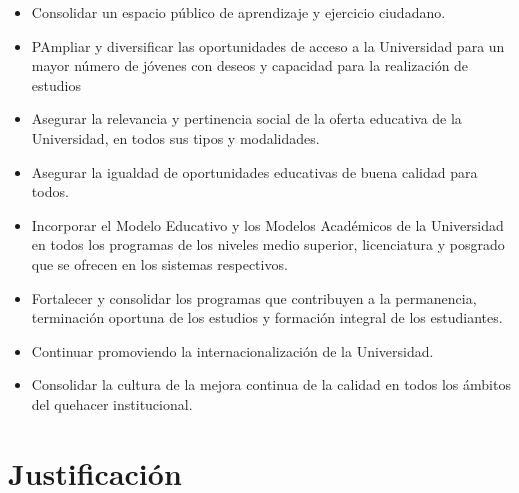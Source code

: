 \documentclass{article}
\begin{document}
\begin{itemize}
\item{Consolidar un espacio p\'{u}blico de aprendizaje y ejercicio
    ciudadano.}
\item{PAmpliar y diversificar las oportunidades de acceso a la
    Universidad para un mayor n\'{u}mero de j\'{o}venes con deseos y capacidad
    para la realizaci\'{o}n de estudios}
\item{Asegurar la relevancia y pertinencia social de la oferta
    educativa de la Universidad, en todos sus tipos y
    modalidades.}
\item{Asegurar la igualdad de oportunidades educativas de buena
    calidad para todos.}
\item{Incorporar el Modelo Educativo y los Modelos Acad\'{e}micos de la
    Universidad en todos los programas de los niveles medio superior,
    licenciatura y posgrado que se ofrecen en los sistemas respectivos.}
    \item{Fortalecer y consolidar los programas que contribuyen a la
    permanencia, terminaci\'{o}n oportuna de los estudios y formaci\'{o}n
    integral de los estudiantes.}
\item{Continuar promoviendo la internacionalizaci\'{o}n de la Universidad.}
\item{Consolidar la cultura de la mejora continua de la calidad en
    todos los \'{a}mbitos del quehacer institucional.}
\end{itemize}

\section{Justificaci\'{o}n}
\end{document}
